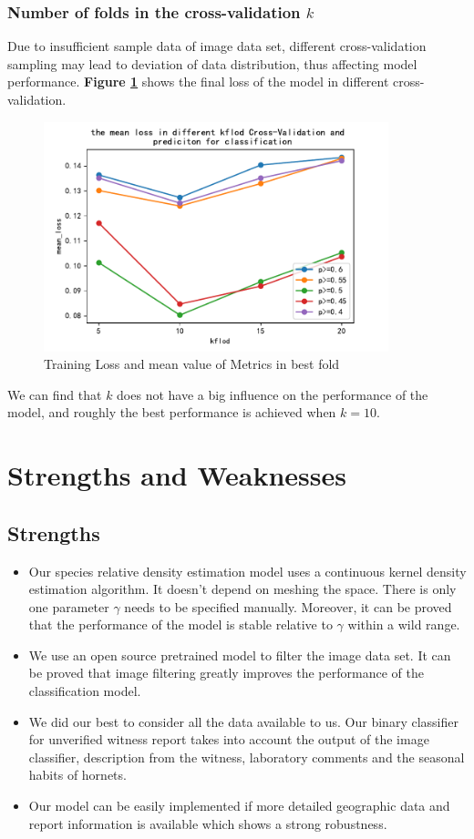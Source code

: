 \documentclass[12pt]{article}
\begin{document}
\subsubsection{Number of folds in the cross-validation $k$}
Due to insufficient sample data of image data set, different cross-validation sampling may lead to deviation of data distribution, thus affecting model performance. \textbf{Figure \ref{kfold_sensitivity}} shows the final loss of the model in different cross-validation.
\begin{figure}[H]%
	\small
	\centering
	\includegraphics[width=10cm]{./pictures/kfold_Sensitivity.pdf}
	\caption{Training Loss and mean value of Metrics in best fold}\label{kfold_sensitivity}
\end{figure}
We can find that $k$ does not have a big influence on the performance of the model, and roughly the best performance is achieved when $k=10$.


\section{Strengths and Weaknesses}
\subsection{Strengths}
\begin{itemize}
	\item Our species relative density estimation model uses a continuous kernel density estimation algorithm. It doesn't depend on meshing the space. There is only one parameter $\gamma$ needs to be specified manually. Moreover, it can be proved that the performance of the model is stable relative to $\gamma$ within a wild range.
	\item We use an open source pretrained model to filter the image data set. It can be proved that image filtering greatly improves the performance of the classification model.
	\item We did our best to consider all the data available to us. Our binary classifier for unverified witness report takes into account the output of the image classifier, description from the witness, laboratory comments and the seasonal habits of hornets.
	\item Our model can be easily implemented if more detailed geographic data and report information is available which shows a strong robustness.
\end{itemize}
\end{document}
